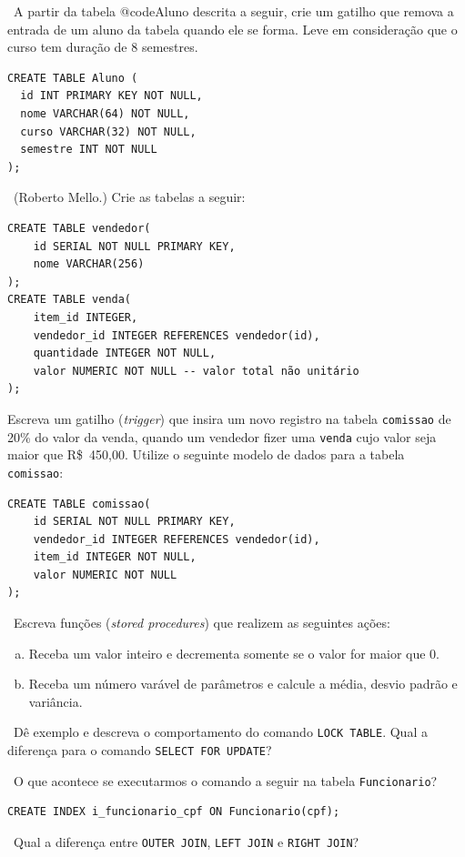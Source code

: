 \exercise~A partir da tabela @code{Aluno} descrita a seguir, crie um gatilho
que remova a entrada de um aluno da tabela quando ele se forma. Leve em consideração 
que o curso tem duração de 8 semestres.

\begin{verbatim}
CREATE TABLE Aluno (
  id INT PRIMARY KEY NOT NULL,
  nome VARCHAR(64) NOT NULL,
  curso VARCHAR(32) NOT NULL,
  semestre INT NOT NULL
);
\end{verbatim}

\exercise~(Roberto Mello.) Crie as tabelas a seguir:

\begin{verbatim}
CREATE TABLE vendedor(
    id SERIAL NOT NULL PRIMARY KEY, 
    nome VARCHAR(256)
);
CREATE TABLE venda(
    item_id INTEGER, 
    vendedor_id INTEGER REFERENCES vendedor(id), 
    quantidade INTEGER NOT NULL, 
    valor NUMERIC NOT NULL -- valor total não unitário
);
\end{verbatim}
 
 Escreva um gatilho ({\em trigger}) que insira um novo 
registro na tabela {\tt comissao} de 20\% do valor da venda, quando um
vendedor fizer uma {\tt venda} cujo valor seja maior que
R\$~450,00. Utilize o seguinte modelo de dados para a tabela {\tt
comissao}:
\begin{verbatim}
CREATE TABLE comissao(
    id SERIAL NOT NULL PRIMARY KEY, 
    vendedor_id INTEGER REFERENCES vendedor(id), 
    item_id INTEGER NOT NULL, 
    valor NUMERIC NOT NULL
);
\end{verbatim}

\exercise~Escreva funções ({\em stored procedures}) que realizem as seguintes
ações:

\begin{enumerate}[a)]
\item Receba um valor inteiro e decrementa somente se o valor for maior que 0.
\item Receba um número varável de parâmetros e calcule a média, desvio padrão e
  variância.
\end{enumerate}

\exercise~Dê exemplo e descreva o comportamento do comando {\tt LOCK TABLE}.
Qual a diferença para o comando {\tt SELECT FOR UPDATE}?

\exercise~O que acontece se executarmos o comando a seguir na tabela {\tt Funcionario}?

\begin{verbatim}
CREATE INDEX i_funcionario_cpf ON Funcionario(cpf);
\end{verbatim}

\exercise~Qual a diferença entre {\tt OUTER JOIN}, {\tt LEFT JOIN} e {\tt RIGHT JOIN}?


